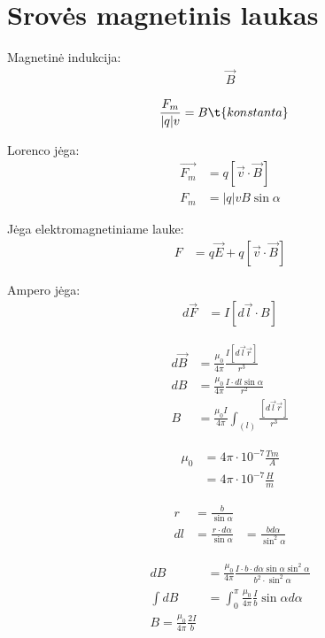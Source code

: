 \section{Srovės magnetinis laukas}

Magnetinė indukcija:
\begin{align*}
  \vec{B}
\end{align*}


\begin{align*}
  \frac{F_{m}}{|q|v} &= B \t{konstanta}
\end{align*}

Lorenco jėga:
\begin{align*}
  \vec{F_{m}} &= q [\vec{v} \cdot \vec{B}] \\
  F_{m} &= |q|vB \sin \alpha
\end{align*}

Jėga elektromagnetiniame lauke:
\begin{align*}
  F &= q \vec{E} + q \left[ \vec{v} \cdot \vec{B} \right]
\end{align*}

Ampero jėga:
\begin{align*}
  d \vec{F} &= I \left[ d\vec{l} \cdot B \right]
\end{align*}

\begin{align*}
  d \vec{B} &= \frac{\mu_{0}}{4\pi} \frac{I [d \vec{l}\vec{r}]}{r^{3}} \\
  dB &= \frac{\mu_{0}}{4\pi} \frac{I\cdot dl \sin \alpha}{r^{2}} \\
  B &= \frac{\mu_{0}I}{4\pi}
    \int _{(l)} \frac{\left[ d\vec{l} \vec{r} \right]}{r^{3}}
\end{align*}

\begin{align*}
  \mu_{0} &= 4 \pi \cdot 10^{-7} \tfrac{Tm}{A} \\
  &= 4 \pi \cdot 10 ^{-7} \tfrac{H}{m}
\end{align*}

\begin{align*}
  r &= \frac{b}{\sin \alpha} \\
  dl &= \frac{r \cdot d \alpha}{\sin \alpha}
  &= \frac{b d \alpha}{\sin ^{2} \alpha}
\end{align*}

\begin{align*}
  dB &= \frac{\mu_{0}}{4\pi}
    \frac{I \cdot b \cdot d\alpha \sin \alpha \sin ^{2} \alpha}{
      b^{2} \cdot \sin ^{2} \alpha} \\
  \int dB &= \int _{0} ^{\pi} \frac{\mu_{0}}{4\pi} 
    \frac{I}{b} \sin \alpha d \alpha \\
  B = \frac{\mu_{0}}{4\pi} \frac{2I}{b}
\end{align*}

